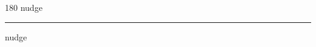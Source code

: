 
\begin{frame}
\begin{center}
\begin{turn}{180}
{\fontsize{2.5cm}{1em}\selectfont nudge}
\end{turn}
\vspace{1em}\par  
\hrule
\vspace{1em}\par  
{\fontsize{2.5cm}{1em}\selectfont nudge}
\end{center}
\end{frame}
